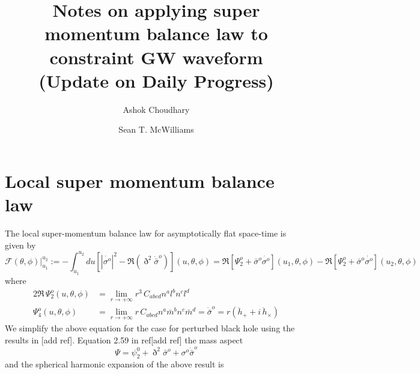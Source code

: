 \documentclass[prd,preprintnumbers,onecolumn,eqsecnum,floatfix,letter]{revtex4}
\begin{document}
\newcommand{\be}{\begin{equation}}
\newcommand{\ee}{\end{equation}}
\newcommand{\ber}{\begin{eqnarray}}
\newcommand{\eer}{\end{eqnarray}}
\def\bea{\begin{eqnarray}}
\def\eea{\end{eqnarray}}
\newcommand{\etal}{\emph{et al.}}


\title{Notes on applying super momentum balance law to constraint GW waveform \\ (Update on Daily Progress) }
\author{Ashok Choudhary}
\author{Sean T. McWilliams}

\begin{abstract}
\end{abstract}

\maketitle

\section{Local super momentum balance law}

The local super-momentum balance law for asymptotically flat space-time is given by 
\begin{equation}
\mathcal{F}(\theta,\phi) \Big|^{u_{2}}_{u_{1}}  := -\int_{u_{1}}^{u_{2}} du \left[|\dot{\sigma^{o}}|^{2} - \Re\left(\eth^{2}\dot{\bar{\sigma}}^{o} \right) \right](u, \theta, \phi) = \Re\left[\Psi^{o}_{2} + \bar{\sigma}^{o}\dot{\sigma^{o}}\right]\left(u_{1}, \theta, \phi\right) - \Re\left[\Psi^{o}_{2} + \bar{\sigma}^{o}\dot{\sigma^{o}}\right]\left(u_{2}, \theta, \phi\right) 
\end{equation}
where
\begin{align}
	2 \Re\, \Psi^{o}_{2}\left(u, \theta, \phi \right) & = \lim_{r \to +\infty} r^{3} \, C_{abcd}n^{a}l^{b}n^{c}l^{d}\label{psi2}\\  \Psi^{o}_{4}\left(u, \theta, \phi \right) & = \lim_{r \to +\infty} r \, C_{abcd}n^{a}\bar{m}^{b}n^{c} \bar{m}^{d} = \ddot{\bar{\sigma}}^{o} = r\left(\ddot{h}_{+} + i\, \ddot{h}_{\times}  \right)
	\label{psi4}
\end{align}
We simplify the above equation for the case for perturbed black hole using the results in [add ref]. Equation 2.59 in ref[add ref] the mass aspect
\begin{equation}
	\Psi = \psi^{0}_{2} + \eth^{2}\bar{\sigma}^{o} + {\sigma}^{o}\dot{\bar{\sigma}}^{o}
\end{equation}
and the spherical harmonic expansion of the above result is
\end{document}
